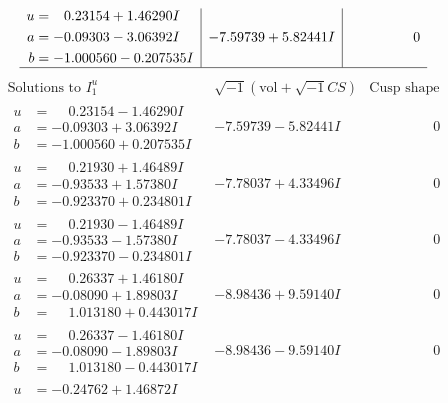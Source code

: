 \documentclass[1p]{elsarticle_modified}
\theoremstyle{definition}
\newcommand{\I}{\sqrt{-1}}
\begin{document}
$$\begin{array}{c|c|c}
\begin{aligned}
u &= \phantom{-}0.23154 + 1.46290 I \\
a &= -0.09303 - 3.06392 I \\
b &= -1.000560 - 0.207535 I\end{aligned}
 & -7.59739 + 5.82441 I & \phantom{-0.000000 } 0\\
 \hline 
 \end{array}$$\newpage$$\begin{array}{c|c|c}  
\text{Solutions to }I^u_{1}& \I (\text{vol} + \sqrt{-1}CS) & \text{Cusp shape}\\
 \hline 
\begin{aligned}
u &= \phantom{-}0.23154 - 1.46290 I \\
a &= -0.09303 + 3.06392 I \\
b &= -1.000560 + 0.207535 I\end{aligned}
 & -7.59739 - 5.82441 I & \phantom{-0.000000 } 0 \\ \hline\begin{aligned}
u &= \phantom{-}0.21930 + 1.46489 I \\
a &= -0.93533 + 1.57380 I \\
b &= -0.923370 + 0.234801 I\end{aligned}
 & -7.78037 + 4.33496 I & \phantom{-0.000000 } 0 \\ \hline\begin{aligned}
u &= \phantom{-}0.21930 - 1.46489 I \\
a &= -0.93533 - 1.57380 I \\
b &= -0.923370 - 0.234801 I\end{aligned}
 & -7.78037 - 4.33496 I & \phantom{-0.000000 } 0 \\ \hline\begin{aligned}
u &= \phantom{-}0.26337 + 1.46180 I \\
a &= -0.08090 + 1.89803 I \\
b &= \phantom{-}1.013180 + 0.443017 I\end{aligned}
 & -8.98436 + 9.59140 I & \phantom{-0.000000 } 0 \\ \hline\begin{aligned}
u &= \phantom{-}0.26337 - 1.46180 I \\
a &= -0.08090 - 1.89803 I \\
b &= \phantom{-}1.013180 - 0.443017 I\end{aligned}
 & -8.98436 - 9.59140 I & \phantom{-0.000000 } 0 \\ \hline\begin{aligned}
u &= -0.24762 + 1.46872 I \\

\end{aligned}
\end{array}$$
\end{document}
